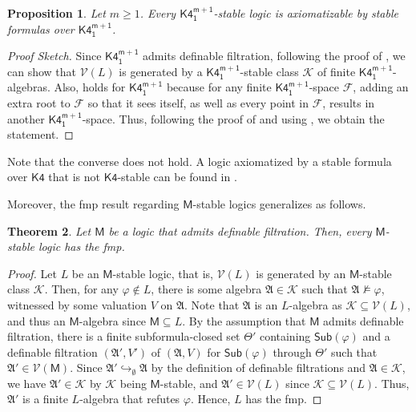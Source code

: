 \documentclass[a4paper,11pt]{article}
\newtheorem{theorem}{Theorem}
\newtheorem{proposition}[theorem]{Proposition}
\theoremstyle{definition}
\theoremstyle{remark}
\numberwithin{theorem}{section}
\newcommand{\alg}[1]{\mathfrak{#1}}
\newcommand{\A}{\alg{A}}
\newcommand{\fr}[1]{\mathcal{#1}}
\newcommand{\F}{\fr{F}}
\newcommand{\class}[1]{\mathcal{#1}}
\newcommand{\V}{\class{V}}
\newcommand{\logic}[1]{\mathsf{#1}}
\newcommand{\Kf}{\logic{K4}}
\newcommand{\Kff}[2]{\logic{K4^{#1}_{#2}}}
\newcommand{\Sub}{\mathsf{Sub}}
\renewcommand{\phi}{\varphi}
\newcommand{\emp}{\emptyset}
\newcommand{\inj}{\hookrightarrow}
\begin{document}
\begin{proposition} \label{4: Prop finitely K4m1 stable}
    Let $m \geq 1$. Every $\Kff{m+1}{1}$-stable logic is axiomatizable by stable formulas over $\Kff{m+1}{1}$. 
\end{proposition}

\begin{proof}[Proof Sketch]
    Since $\Kff{m+1}{1}$ admits definable filtration, following the proof of \cite[Theorem 3.8]{stablemodallogic}, we can show that $\V(L)$ is generated by a $\Kff{m+1}{1}$-stable class $\class{K}$ of finite $\Kff{m+1}{1}$-algebras. Also, \cite[Lemma 4.5]{stablemodallogic} holds for $\Kff{m+1}{1}$ because for any finite $\Kff{m+1}{1}$-space $\F$, adding an extra root to $\F$ so that it sees itself, as well as every point in $\F$, results in another $\Kff{m+1}{1}$-space. Thus, following the proof of  \cite[Theorem 4.7]{stablemodallogic} and using , we obtain the statement. 
\end{proof}

Note that the converse does not hold. A logic axiomatized by a stable formula over $\Kf$ that is not $\Kf$-stable can be found in \cite[Example 4.11]{stablemodallogic}.

Moreover, the fmp result regarding $\logic{M}$-stable logics \cite[Proposition 3.3]{stablemodallogic} generalizes as follows.

\begin{theorem} \label{3: Thm M-stable fmp}
    Let $\logic{M}$ be a logic that admits definable filtration. Then, every $\logic{M}$-stable logic has the fmp. 
\end{theorem}

\begin{proof}
    Let $L$ be an $\logic{M}$-stable logic, that is, $\V(L)$ is generated by an $\logic{M}$-stable class $\class{K}$. Then, for any $\phi \notin L$, there is some algebra $\A \in \class{K}$ such that $\A \not\models \phi$, witnessed by some valuation $V$ on $\A$. Note that $\A$ is an $L$-algebra as $\class{K} \subseteq \V(L)$, and thus an $\logic{M}$-algebra since $\logic{M} \subseteq L$. By the assumption that $\logic{M}$ admits definable filtration, there is a finite subformula-closed set $\Theta'$ containing $\Sub(\phi)$ and a definable filtration $(\A', V')$ of $(\A, V)$ for $\Sub(\phi)$ through $\Theta'$ such that $\A' \in \V(\logic{M})$. Since $\A' \inj_\emp \A$ by the definition of definable filtrations and $\A \in \class{K}$, we have $\A' \in \class{K}$ by $\class{K}$ being $\logic{M}$-stable, and $\A' \in \V(L)$ since $\class{K} \subseteq \V(L)$. Thus, $\A'$ is a finite $L$-algebra that refutes $\phi$. Hence, $L$ has the fmp.
\end{proof}
\end{document}
